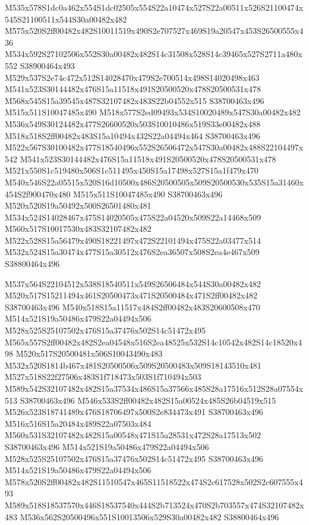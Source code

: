 \documentclass{article}
\begin{document}
\begin{multicols}{2}
M535x578S1dc0a462x554S1dc02505x554S22a10474x527S22a00511x526S21100474x545S21100511x544S30a00482x482 M575x520S2ff00482x482S10011519x490S2e707527x469S19a20547x453S26500555x436 M534x592S27102506x552S30a00482x482S14c31508x528S14c39465x527S2711a480x552 S38900464x493 M529x537S2e74c472x512S14028470x479S2e700514x498S14020498x463 M541x523S30144482x476S15a11518x491S20500520x478S20500531x478 M568x545S15a39545x487S32107482x483S22b04552x515 S38700463x496 M515x511S10047485x490 M518x577S2ed09493x534S10020489x547S30a00482x482 M536x549S30124482x477S26600520x503S10010486x519S33e00482x488 M518x518S2ff00482x483S15a10494x432S22a04494x464 S38700463x496 M522x567S30100482x477S18540496x552S26506472x547S30a00482x488S22104497x542 M541x523S30144482x476S15a11518x491S20500520x478S20500531x478 M521x550S1c519480x506S1c511495x450S15a17498x527S15a1f479x470 M540x546S22a05515x520S16d10500x486S20500505x509S20500530x535S15a31460x454S2f900470x480 M515x511S10047485x490 S38700463x496 M520x520S19a50492x500S26501480x481 M534x524S14028467x475S14020505x475S22a04520x509S22a14468x509 M560x517S10017530x483S32107482x482 M522x528S15a56479x490S18221497x472S22101494x475S22a03477x514 M532x524S15a30474x477S15a30512x476S2ea36507x508S2ea4e467x509 S38800464x496


M537x564S22104512x538S18540511x549S26506484x544S30a00482x482 M520x517S15211494x461S20500473x471S20500484x471S2ff00482x482 S38700463x496 M540x518S15a11517x484S2ff00482x483S20600508x470 M514x521S19a50486x479S22a04494x506 M528x525S25107502x476S15a37476x502S14c51472x495 M565x557S2ff00482x482S2ea04548x516S2ea48525x532S14c10542x482S14c18520x498 M520x517S20500481x506S10043490x483 M532x520S1814b467x481S20500506x509S20500483x509S18143510x481 M527x518S22f27506x483S1f718473x503S1f710494x503 M589x542S32107482x482S15a37534x486S15a37566x485S28a17516x512S28a07554x513 S38700463x496 M546x533S2ff00482x482S15a00524x485S26b04519x515 M526x523S18741489x476S18706497x500S2e834473x491 S38700463x496 M516x516S15a20484x489S22a07503x484 M560x531S32107482x482S15a00548x471S15a28531x472S28a17513x502 S38700463x496 M514x521S19a50486x479S22a04494x506 M528x525S25107502x476S15a37476x502S14c51472x495 S38700463x496 M514x521S19a50486x479S22a04494x506 M578x520S2ff00482x482S11510547x465S11518522x474S2c617528x502S2c607555x493 M589x518S18537570x446S18537540x444S2b713524x470S2b703557x474S32107482x483 M536x562S20500496x551S10013506x529S30a00482x482 S38800464x496


\end{multicols}
\end{document}
